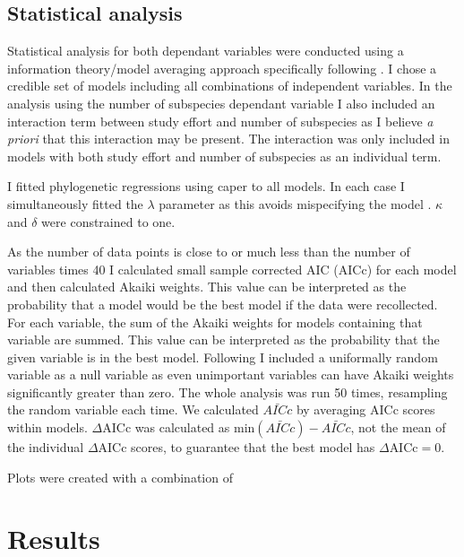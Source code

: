 \subsection{Statistical analysis}

Statistical analysis for both dependant variables were conducted using a information theory/model averaging approach \cite{burnham2002model} specifically following \cite{whittingham2005habitat, whittingham2006we}.
I chose a credible set of models including all combinations of independent variables.
In the analysis using the number of subspecies dependant variable I also included an interaction term between study effort and number of subspecies as I believe \emph{a priori} that this interaction may be present.
The interaction was only included in models with both study effort and number of subspecies as an individual term.

I fitted phylogenetic regressions using caper \cite{nlme} to all models.
In each case I simultaneously fitted the $\lambda$ parameter as this avoids mispecifying the model \cite{revell2010phylogenetic}.
$\kappa$ and $\delta$ were constrained to one.

As the number of data points is close to or much less than the number of variables times 40 I calculated small sample corrected AIC (AICc) for each model and then calculated Akaiki weights.
This value can be interpreted as the probability that a model would be the best model if the data were recollected.
For each variable, the sum of the Akaiki weights for models containing that variable are summed.
This value can be interpreted as the probability that the given variable is in the best model.
Following \cite{whittingham2005habitat} I included a uniformally random variable as a null variable as even unimportant variables can have Akaiki weights significantly greater than zero.
The whole analysis was run 50 times, resampling the random variable each time.
We calculated $\bar{AICc}$ by averaging AICc scores within models.
$\Delta\text{AICc}$ was calculated as $\text{min}(\bar{AICc}) - \bar{AICc}$, not the mean of the individual $\Delta\text{AICc}$ scores, to guarantee that the best model has $\Delta\text{AICc} = 0$.


Plots were created with a combination of \cite{ggplot2, palettetown, dotwhisker, ggtree}

\clearpage
\section{Results}

